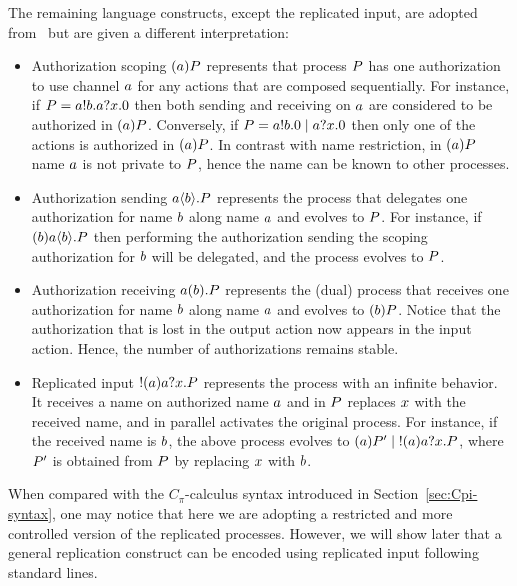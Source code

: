 The remaining language constructs, except the replicated input, are adopted from~\cite{DBLP:journals/corr/GhilezanJPPV16} but are given a different interpretation:
\begin{itemize}
\item Authorization scoping $(a) P$ represents that process
$P$ has one authorization to use channel $a$  for any actions that are composed sequentially. For instance, if $P=a!b.a?x.0$ then both sending and receiving on $a$ are considered to be authorized in $(a)P$. Conversely, if  $P=a!b.0 \;|\; a?x.0$ then only one of the actions is authorized in $(a)P$.
In contrast with name restriction, in $(a)P$ name $a$ is not private to $P$, hence the name can be known to other processes.
\item Authorization sending $a\langle b\rangle.P$ represents the process that delegates one authorization for name $b$ along name $a$ and evolves to $P$. For instance, if $(b)a\langle b\rangle.P$ then performing the authorization sending the scoping authorization for $b$ will be delegated, and the process evolves to $P$.
\item Authorization receiving $a(b).P$ represents the (dual) process that receives one authorization for name $b$ along name $a$ and evolves to $(b)P$. Notice that the authorization that is lost in the output action now appears in the input action. Hence, the number of authorizations remains stable.
\item 
Replicated input $!(a)a?x.P$ represents the process with an infinite behavior. It receives a name on authorized name $a$ and in $P$ replaces $x$ with the received name, and in parallel activates the original process. For instance, if the received name is $b$, the above process evolves to $(a)P' \;|\;!(a)a?x.P$, where $P'$ is obtained from $P$ by replacing $x$ with $b$.
\end{itemize} 
When compared with the $C_\pi$-calculus syntax introduced in Section~\ref{sec:Cpi-syntax}, one may notice that here we are adopting a restricted and more controlled version of the replicated processes. However, we will show later that a general replication construct 
can be encoded using replicated input following standard lines.

